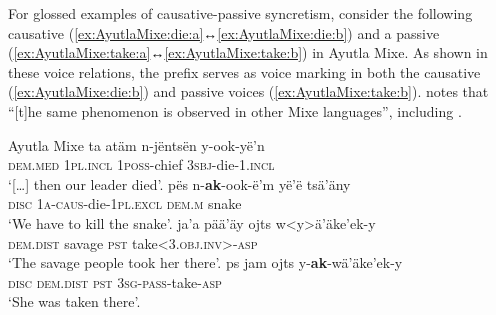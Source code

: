 For glossed examples of causative-passive syncretism, consider the following causative  (\ref{ex:AyutlaMixe:die:a}↔\ref{ex:AyutlaMixe:die:b}) and a passive  (\ref{ex:AyutlaMixe:take:a}↔\ref{ex:AyutlaMixe:take:b}) in Ayutla Mixe. As shown in these voice relations, the prefix  serves as voice marking in both the causative (\ref{ex:AyutlaMixe:die:b}) and passive voices (\ref{ex:AyutlaMixe:take:b}). \citet[370]{romero-mendez:2009} notes that “[t]he same phenomenon is observed in other Mixe languages”, including  \citep{zavala:2000}. 

\ea Ayutla Mixe \citep[482, 495]{romero-mendez:2009}
\ea\label{ex:AyutlaMixe:die:a}
	\gll	ta atäm n-jëntsën y-ook-yë’n \\
			\textsc{dem.med} \textsc{1pl.incl} \textsc{1poss}-chief \textsc{3sbj}-die-\textsc{1.incl} \\
	\glt	‘[…] then our leader died’.
\ex\label{ex:AyutlaMixe:die:b}
	\gll	pës n-\textbf{ak}-ook-ë’m yë’ë tsä’äny \\
			\textsc{disc} \textsc{1a-caus}-die-\textsc{1pl.excl} \textsc{dem.m} snake \\
	\glt	‘We have to kill the snake’.
\ex\label{ex:AyutlaMixe:take:a}
	\gll	ja’a pää’äy ojts w<y>ä’äke’ek-y \\
			\textsc{dem.dist} savage \textsc{pst} take<\textsc{3.obj.inv}>-\textsc{asp} \\
	\glt	‘The savage people took her there’.
\ex\label{ex:AyutlaMixe:take:b}
	\gll	ps jam ojts y-\textbf{ak}-wä’äke’ek-y \\
			\textsc{disc} \textsc{dem.dist} \textsc{pst} \textsc{3sg-pass}-take-\textsc{asp} \\
	\glt	‘She was taken there’.
	\z 
\z

